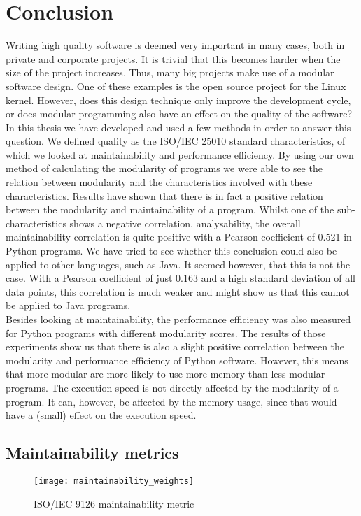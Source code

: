 \documentclass[twoside]{uva-inf-bachelor-thesis}
\begin{document}
\chapter{Conclusion}
Writing high quality software is deemed very important in many cases, both in private and corporate projects. It is trivial that this becomes harder when the size of the project increases. Thus, many big projects make use of a modular software design. One of these examples is the open source project for the Linux kernel\cite{lee2000linux}. However, does this design technique only improve the development cycle, or does modular programming also have an effect on the quality of the software?\\

In this thesis we have developed and used a few methods in order to answer this question. We defined quality as the ISO/IEC 25010 standard characteristics\cite{ISO25010}, of which we looked at maintainability and performance efficiency. By using our own method of calculating the modularity of programs we were able to see the relation between modularity and the characteristics involved with these characteristics. Results have shown that there is in fact a positive relation between the modularity and maintainability of a program. Whilst one of the sub-characteristics shows a negative correlation, analysability, the overall maintainability correlation is quite positive with a Pearson coefficient of 0.521 in Python programs. We have tried to see whether this conclusion could also be applied to other languages, such as Java. It seemed however, that this is not the case. With a Pearson coefficient of just 0.163 and a high standard deviation of all data points, this correlation is much weaker and might show us that this cannot be applied to Java programs.\\

Besides looking at maintainability, the performance efficiency was also measured for Python programs with different modularity scores. The results of those experiments show us that there is also a slight positive correlation between the modularity and performance efficiency of Python software. However, this means that more modular are more likely to use more memory than less modular programs. The execution speed is not directly affected by the modularity of a program. It can, however, be affected by the memory usage, since that would have a (small) effect on the execution speed.




\begin{appendices}
\chapter{Maintainability metrics}
\label{appendix:maintainability_metrics}
\begin{figure}[H]
    \label{figure:maintainability_weights}
    \caption{ISO/IEC 9126 maintainability metric}
    \centering
        \texttt{[image: maintainability\_weights]}
\end{figure}

\end{appendices}
\end{document}
